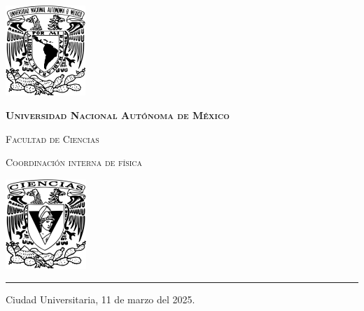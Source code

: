 \documentclass[9pt,letterpaper]{article}
\begin{document}
	
	
	\begin{center}
		\begin{minipage}{3cm}
			\begin{center}
				\includegraphics[height=3.4cm]{../Figuras/Logo_UNAM (1)}
			\end{center}
		\end{minipage}\hfill
		\begin{minipage}{10cm}
			\begin{center}
				{\scshape\LARGE \textbf{Universidad Nacional Autónoma de México} \par}
				{\scshape\Large Facultad de Ciencias\par}
				{\scshape\Large Coordinación interna de física\par}
			\end{center}
		\end{minipage}\hfill
		\begin{minipage}{3cm}
			\begin{center}
				\includegraphics[height=3.4cm]{../Figuras/Logo_FC (1)}
			\end{center}
		\end{minipage}
	\end{center}
	
	\rule{17cm}{0.1mm}
	
	\hspace{0.5cm}
	
	\parbox{\textwidth}{\raggedleft Ciudad Universitaria, 11 de marzo del 2025.}
	
	\hspace{1cm}
	
	\vspace{0.5cm}
	
\end{document}
